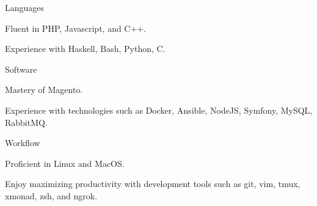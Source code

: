 \begin{cvskills}
  \cvskill
    {Languages}
    {
      \begin{cvitems}
        \item Fluent in PHP, Javascript, and C++.
        \item Experience with Haskell, Bash, Python, C.
      \end{cvitems}
    }
  \cvskill
    {Software}
    {
      \begin{cvitems}
        \item Mastery of Magento.
        \item Experience with technologies such as Docker, Ansible, NodeJS, Symfony, MySQL, RabbitMQ.
      \end{cvitems}
    }
  \cvskill
    {Workflow}
    {
      \begin{cvitems}
        \item Proficient in Linux and MacOS.
        \item Enjoy maximizing productivity with development tools such as git, vim, tmux, xmonad, zsh, and ngrok.
      \end{cvitems}
    }
\end{cvskills}

